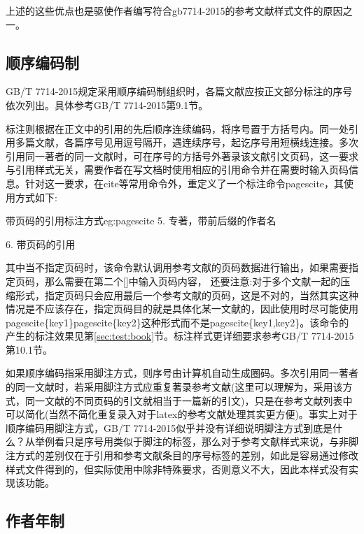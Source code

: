 \documentclass[11pt]{article} %
\newcommand{\qd}[1]{%
{\fangsong\color{blue}#1}}
\begin{document}
上述的这些优点也是驱使作者编写符合gb7714-2015的参考文献样式文件的原因之一。

\subsection{顺序编码制}

GB/T 7714-2015规定采用顺序编码制组织时，各篇文献应按正文部分标注的序号依次列出。具体参考GB/T 7714-2015第9.1节。

标注则根据在正文中的引用的先后顺序连续编码，将序号置于方括号内。同一处引用多篇文献，各篇序号见用逗号隔开，遇连续序号，起讫序号用短横线连接。多次引用同一著者的同一文献时，可在序号的方括号外著录该文献引文页码，这一要求与引用样式无关，需要作者在写文档时使用相应的引用命令并在需要时输入页码信息。针对这一要求，在cite等常用命令外，重定义了一个标注命令pagescite，其使用方式如下:

\begin{codetex}{带页码的引用标注方式}{eg:pagescite}
5. 专著，带前后缀的作者名\cite{Peebles2001-100-100}

6. 带页码的引用
\end{codetex}

其中当不指定页码时，该命令默认调用参考文献的页码数据进行输出，如果需要指定页码，那么需要在第二个[]中输入页码内容，\qd{还要注意:对于多个文献一起的压缩形式，指定页码只会应用最后一个参考文献的页码，这是不对的，当然其实这种情况是不应该存在，指定页码目的就是具体化某一文献的，因此使用时尽可能使用pagescite\{key1\}pagescite\{key2\}这种形式而不是pagescite\{key1,key2\}}。该命令的产生的标注效果见第\ref{sec:test:book}节。标注样式更详细要求参考GB/T 7714-2015 第10.1节。

如果顺序编码指采用脚注方式，则序号由计算机自动生成圈码。多次引用同一著者的同一文献时，若采用脚注方式应重复著录参考文献(这里可以理解为，采用该方式，同一文献的不同页码的引文就相当于一篇新的引文)，只是在参考文献列表中可以简化(当然不简化重复录入对于latex的参考文献处理其实更方便)。事实上对于顺序编码用脚注方式，GB/T 7714-2015似乎并没有详细说明脚注方式到底是什么？从举例看只是序号用类似于脚注的标签，那么对于参考文献样式来说，与非脚注方式的差别仅在于引用和参考文献条目的序号标签的差别，如此是容易通过修改样式文件得到的，但实际使用中除非特殊要求，否则意义不大，因此本样式没有实现该功能。

\subsection{作者年制}
\end{document}
